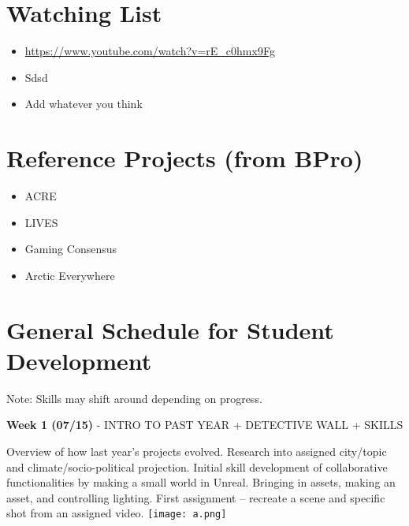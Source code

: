 \documentclass{article}
\begin{document}
\section{Watching List}
\begin{itemize}
    \item \url{https://www.youtube.com/watch?v=rE_c0hmx9Fg}
    \item Sdsd
    \item Add whatever you think
\end{itemize}

\section{Reference Projects (from BPro)}
\begin{itemize}
    \item ACRE
    \item LIVES
    \item Gaming Consensus
    \item Arctic Everywhere
\end{itemize}

\section{General Schedule for Student Development}
Note: Skills may shift around depending on progress.

\textbf{Week 1 (07/15)} - INTRO TO PAST YEAR + DETECTIVE WALL + SKILLS

Overview of how last year's projects evolved.
Research into assigned city/topic and climate/socio-political projection.
Initial skill development of collaborative functionalities by making a small world in Unreal. Bringing in assets, making an asset, and controlling lighting.
First assignment – recreate a scene and specific shot from an assigned video.
\newline
\texttt{[image: a.png]}
\end{document}
